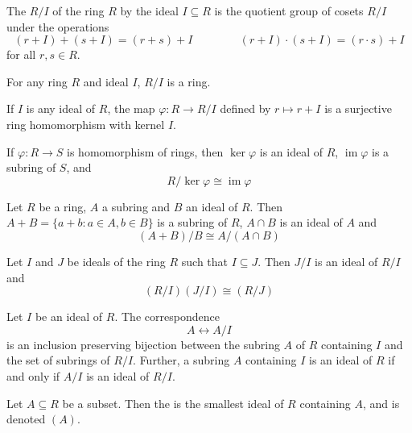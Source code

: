 \documentclass{mathnotes}
\DeclareMathOperator{\im}{im}
\begin{document}
\begin{bdefi}
    The  $R/I$ of the ring $R$ by the ideal $I\subseteq
    R$ is the quotient group of cosets $R/I$ under the operations
    $$(r+I)+(s+I)=(r+s)+I\hspace{50pt}(r+I)\cdot(s+I)=(r\cdot s)+I$$
    for all $r,s\in R$.
\end{bdefi}

\begin{prop}
  For any ring $R$ and ideal $I$, $R/I$ is a ring.
\end{prop}

\begin{prop}
  If $I$ is any ideal of $R$, the map $\varphi:R\to R/I$ defined by $r\mapsto
  r+I$ is a surjective ring homomorphism with kernel $I$.
\end{prop}

\begin{thm}
  If $\varphi:R\to S$ is homomorphism of rings, then $\ker\varphi$ is an ideal
  of $R$, $\im\varphi$ is a subring of $S$, and
  $$R/\ker\varphi\cong\im\varphi$$
\end{thm}

\begin{thm}
  Let $R$ be a ring, $A$ a subring and $B$ an ideal of $R$. Then
  $A+B=\{a+b:a\in A,b\in B\}$ is a subring of $R$, $A\cap B$ is an ideal of $A$
  and
  $$(A+B)/B\cong A/(A\cap B)$$
\end{thm}

\begin{thm}
  Let $I$ and $J$ be ideals of the ring $R$ such that $I\subseteq J$. Then
  $J/I$ is an ideal of $R/I$ and
  $$(R/I)(J/I)\cong(R/J)$$
\end{thm}

\begin{thm}
  Let $I$ be an ideal of $R$. The correspondence
  $$A\longleftrightarrow A/I$$
  is an inclusion preserving bijection between the subring $A$ of $R$
  containing $I$ and the set of subrings of $R/I$. Further, a subring $A$
  containing $I$ is an ideal of $R$ if and only if $A/I$ is an ideal of $R/I$.
\end{thm}

\begin{bdefi}
  Let $A\subseteq R$ be a subset. Then the  is
  the smallest ideal of $R$ containing $A$, and is denoted $(A)$.
\end{bdefi}
\end{document}
